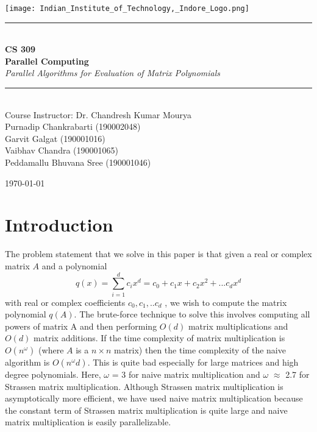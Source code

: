 \documentclass[12pt,a4paper]{article}
\newcommand{\HRule}{\rule{\linewidth}{0.5mm}}
\begin{document}
\begin{titlepage}
\begin{center}

\texttt{[image: Indian\_Institute\_of\_Technology,\_Indore\_Logo.png]}~\\[2cm]


\HRule \\[0.4cm]
{ \LARGE 
  \textbf{CS 309 \\ Parallel Computing}\\[0.4cm]
  \emph{Parallel Algorithms for Evaluation of Matrix Polynomials}\\[0.4cm]
}
\HRule \\[1.5cm]



{ \large
  Course Instructor: Dr. Chandresh Kumar Mourya\\[0.8cm]
  Purnadip Chankrabarti (190002048) \\[0.1cm]
  Garvit Galgat (190001016) \\[0.1cm]
  Vaibhav Chandra (190001065) \\[0.1cm]
  Peddamallu Bhuvana Sree (190001046) \\[0.1cm]
}

\vfill


{\large \today}
 
\end{center}
\end{titlepage}

\newpage

\tableofcontents
{}
\newpage
\setcounter{page}{1}

\section{Introduction}\label{sec:intro}

The problem statement that we solve in this paper is that given a real or complex matrix $A$ and a polynomial $$q(x) = \sum_{i=1}^{d} c_{i}x^{d} = c_{0} + c_{1}x + c_{2}x^{2} + ... c_{d}x^{d}$$ with real or complex coefficients $c_{0},c_{1},..c_{d}$ , we wish to compute the matrix polynomial $q(A)$. The brute-force technique to solve this involves computing all powers of matrix A and then performing $O(d)$ matrix multiplications and $O(d)$ matrix additions. If the time complexity of matrix multiplication is $O(n^{\omega})$ (where $A$ is a $n \times n$ matrix) then the time complexity of the naive algorithm is $O(n^{\omega}d)$. This is quite bad especially for large matrices and high degree polynomials. Here, $\omega$ = 3 for naive matrix multiplication and $\omega$ $\approx$ 2.7 for Strassen matrix multiplication. Although Strassen matrix multiplication is asymptotically more efficient, we have used naive matrix multiplication because the constant term of Strassen matrix multiplication is quite large and naive matrix multiplication is easily parallelizable.  
\end{document}
